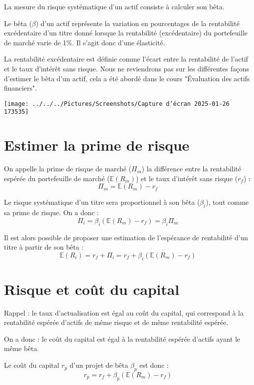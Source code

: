 \documentclass[a4paper, 12pt]{report}
\begin{document}
La mesure du risque systématique d'un actif consiste à calculer son bêta. 

Le bêta (\( \beta \)) d'un actif représente la variation en pourcentages de la rentabilité excédentaire d'un titre donné lorsque la rentabilité (excédentaire) du portefeuille de marché varie de 1\%. Il s'agit donc d'une élasticité.

La rentabilité excédentaire est définie comme l'écart entre la rentabilité de l'actif et le taux d'intérêt sans risque. Nous ne reviendrons pas sur les différentes façons d'estimer le bêta d'un actif, cela a été abordé dans le cours "Évaluation des actifs financiers".

\begin{center}
	\texttt{[image: ../../../Pictures/Screenshots/Capture d'écran 2025-01-26 173535]}
\end{center}

\section{Estimer la prime de risque}

On appelle la prime de risque de marché ($\Pi_m$) la différence entre la rentabilité espérée du portefeuille de marché ($\mathbb{E}(R_m)$) et le taux d'intérêt sans risque ($r_f$) :
\[
\Pi_m = \mathbb{E}(R_m) - r_f
\]

Le risque systématique d'un titre sera proportionnel à son bêta ($\beta_i$), tout comme sa prime de risque. On a donc :
\[
\Pi_i =\beta_i(\mathbb{E}(R_m) - r_f) = \beta_i \Pi_m
\]

Il est alors possible de proposer une estimation de l'espérance de rentabilité d'un titre à partir de son bêta :
\[
\mathbb{E}(R_i) = r_f + \Pi_i = r_f + \beta_i (\mathbb{E}(R_m) - r_f)
\]

\section{Risque et coût du capital}

Rappel : le taux d'actualisation est égal au coût du capital, qui correspond à la rentabilité espérée d'actifs de même risque et de même rentabilité espérée.

On a donc : le coût du capital est égal à la rentabilité espérée d'actifs ayant le même bêta.

Le coût du capital $r_p$ d'un projet de bêta $\beta_p$ est donc :
\[
r_p = r_f + \beta_p (\mathbb{E}(R_m) - r_f)
\]
\end{document}
